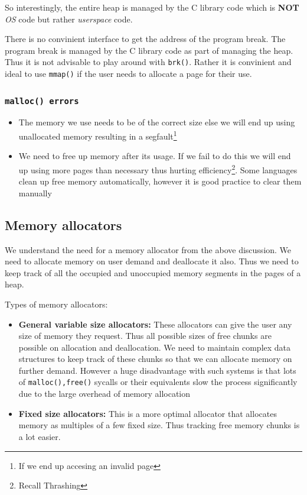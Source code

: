 \documentclass[12pt]{article}
\newcommand{\tbox}[1]{\noindent\fbox{\parbox{\textwidth}{#1}}}
\begin{document}
So interestingly, the entire heap is managed by the C library code which is \textbf{NOT} \textit{OS} code but rather \textit{userspace} code.

There is no convinient interface to get the address of the program break. The program break is managed by the C library code as part of managing the heap. Thus
it is not advisable to play around with \texttt{brk()}. Rather it is convinient and ideal to use \texttt{mmap()} if the user needs to allocate a page for their use. 
\subsubsection{\texttt{malloc() errors}}
\begin{itemize}[topsep=0pt, partopsep=0pt, itemsep=0pt, parsep=0pt]
    \item The memory we use needs to be of the correct size else we will end up using unallocated memory resulting in a segfault\footnote{If we end up accesing an invalid page}
    \item  We need to free up memory after its usage. If we fail to do this we will end up using more pages than necessary thus hurting efficiency\footnote{Recall Thrashing}. Some languages clean up free memory automatically, however it is good practice to 
    clear them manually
\end{itemize}
\noindent\tbox{
    \begin{center}
    \textbf{\Huge Lecture 19}
    \end{center}
}
\subsection{Memory allocators}
We understand the need for a memory allocator from the above discussion. We need to allocate memory on user demand and deallocate it also. 
Thus we need to keep track of all the occupied and unoccupied memory segments in the pages of a heap.

Types of memory allocators:
\begin{itemize}[topsep=0pt, partopsep=0pt, itemsep=0pt, parsep=0pt]
    \item \textbf{General variable size allocators:} These allocators can give the user any size of memory they request. Thus all possible sizes of free chunks are possible on allocation and deallocation. We need to 
    maintain complex data structures to keep track of these chunks so that we can allocate memory on further demand. However a huge disadvantage with such systems is that lots of \texttt{malloc(),free()} sycalls or their equivalents slow the process significantly due to the large overhead of memory allocation
    \item \textbf{Fixed size allocators:} This is a more optimal allocator that allocates memory as multiples of a few fixed size. Thus tracking free memory chunks is a lot easier. 
\end{itemize}
\end{document}
